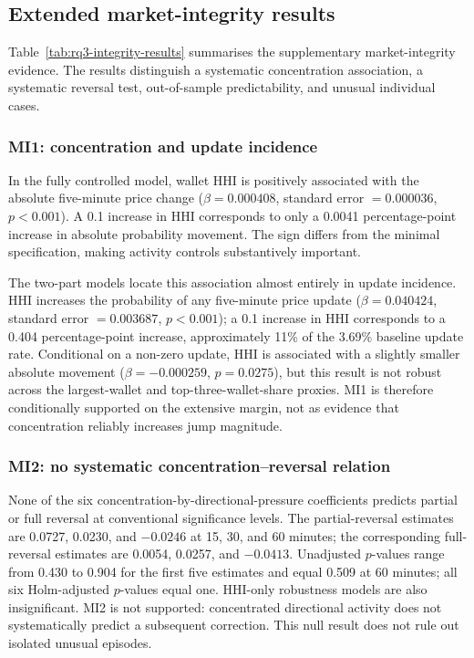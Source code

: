 \subsection{Extended market-integrity results}
\label{sec:rq3-integrity-results}

Table~\ref{tab:rq3-integrity-results} summarises the supplementary market-integrity evidence.
The results distinguish a systematic concentration association, a systematic
reversal test, out-of-sample predictability, and unusual individual cases.



\subsubsection{MI1: concentration and update incidence}

In the fully controlled model, wallet HHI is positively associated with the
absolute five-minute price change ($\beta=0.000408$, standard error $=0.000036$,
$p<0.001$). A 0.1 increase in HHI corresponds to only a 0.0041 percentage-point
increase in absolute probability movement. The sign differs from the minimal
specification, making activity controls substantively important.

The two-part models locate this association almost entirely in update incidence.
HHI increases the probability of any five-minute price update
($\beta=0.040424$, standard error $=0.003687$, $p<0.001$); a 0.1 increase in HHI
corresponds to a 0.404 percentage-point increase, approximately 11\% of the
3.69\% baseline update rate. Conditional on a non-zero update, HHI is associated
with a slightly smaller absolute movement ($\beta=-0.000259$, $p=0.0275$), but
this result is not robust across the largest-wallet and top-three-wallet-share
proxies. MI1 is therefore conditionally supported on the extensive margin, not
as evidence that concentration reliably increases jump magnitude.

\subsubsection{MI2: no systematic concentration--reversal relation}

None of the six concentration-by-directional-pressure coefficients predicts
partial or full reversal at conventional significance levels. The
partial-reversal estimates are 0.0727, 0.0230, and $-0.0246$ at 15, 30, and 60 minutes;
the corresponding full-reversal estimates are 0.0054, 0.0257, and $-0.0413$.
Unadjusted $p$-values range from 0.430 to 0.904 for the first five estimates and
equal 0.509 at 60 minutes; all six Holm-adjusted $p$-values equal one. HHI-only
robustness models are also insignificant. MI2 is not supported: concentrated
directional activity does not systematically predict a subsequent correction.
This null result does not rule out isolated unusual episodes.


